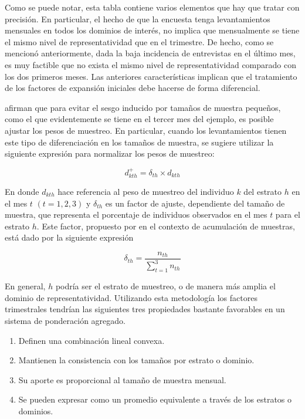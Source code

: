 \documentclass[
  12pt,
]{book}
\providecommand{\tightlist}{%
  \setlength{\itemsep}{0pt}\setlength{\parskip}{0pt}}
\begin{document}
Como se puede notar, esta tabla contiene varios elementos que hay que
tratar con precisión. En particular, el hecho de que la encuesta tenga
levantamientos mensuales en todos los dominios de interés, no
implica que mensualmente se tiene el mismo nivel de representatividad que en el trimestre. De hecho, como se mencionó anteriormente, dada la baja incidencia de entrevistas en el último mes, es muy factible que no exista el mismo nivel de representatividad comparado con los dos primeros meses. Las anteriores características implican que el tratamiento de
los factores de expansión iniciales debe hacerse de forma diferencial.

\citet{Heeringa_West_Berglund_2017} afirman que para evitar el sesgo inducido
por tamaños de muestra pequeños, como el que evidentemente se tiene en
el tercer mes del ejemplo, es posible ajustar los pesos de
muestreo. En particular, cuando los levantamientos tienen este tipo de diferenciación en los tamaños de muestra, se sugiere utilizar la siguiente
expresión para normalizar los pesos de muestreo:

\[
d_{kth}^{+}=\delta_{th} \times d_{kth}
\]

En donde \(d_{kth}\) hace referencia al peso de muestreo del individuo \(k\)
del estrato \(h\) en el mes \(t\) \((t=1, 2, 3)\) y \(\delta_{th}\) es un factor
de ajuste, dependiente del tamaño de muestra, que representa el
porcentaje de individuos observados en el mes \(t\) para el estrato \(h\).
Este factor, propuesto por \citet[p.~131]{Kish_1999} en el contexto de
acumulación de muestras, está dado por la siguiente expresión

\[
\delta_{th} = \frac{n_{th}}{\sum_{t = 1} ^3 n_{th}}
\]

En general, \(h\) podría ser el estrato de muestreo, o de manera más
amplia el dominio de representatividad. Utilizando esta metodología los factores trimestrales tendrían las
siguientes tres propiedades bastante favorables en un sistema de
ponderación agregado.

\begin{enumerate}
\def\labelenumi{\arabic{enumi}.}
\tightlist
\item
  Definen una combinación lineal convexa.
\item
  Mantienen la consistencia con los tamaños por estrato o dominio.
\item
  Su aporte es proporcional al tamaño de muestra mensual.
\item
  Se pueden expresar como un promedio equivalente a través de los estratos o dominios.
\end{enumerate}
\end{document}
